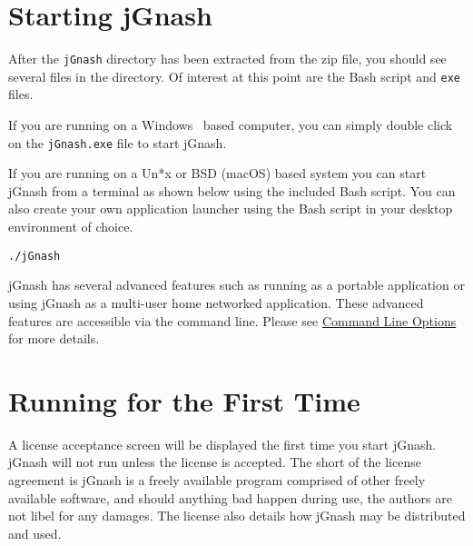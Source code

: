 \documentclass[letterpaper,12pt]{book}
\begin{document}
   
    \section{Starting jGnash}\label{sec:starting-jgnash}

    After the \texttt{jGnash} directory has been extracted from the zip file, you should see several files in the directory.
    Of interest at this point are the Bash script and \texttt{exe} files.

    If you are running on a Windows\texttrademark~ based computer, you can simply double click on the \texttt{jGnash.exe} file to
    start jGnash.

    If you are running on a Un*x or BSD (macOS) based system you can start jGnash from a terminal as shown below using
    the included Bash script.
    You can also create your own application launcher using the Bash script in your desktop environment of choice.

    \begin{mdframed}[style=info]
        \texttt{./jGnash}
    \end{mdframed}

    jGnash has several advanced features such as running as a portable application or using jGnash as a multi-user home
    networked application. These advanced features are accessible via the command line.
    Please see \hyperref[ch:cmdOptions]{Command Line Options} for more details.

    \section{Running for the First Time}\label{sec:running-for-the-first-time}
    A license acceptance screen will be displayed the first time you start jGnash.
    jGnash will not run unless the license is accepted.
    The short of the license agreement is jGnash is a freely available program comprised of other freely available software,
    and should anything bad happen during use, the authors are not libel for any damages.
    The license also details how jGnash may be distributed and used.

\end{document}
